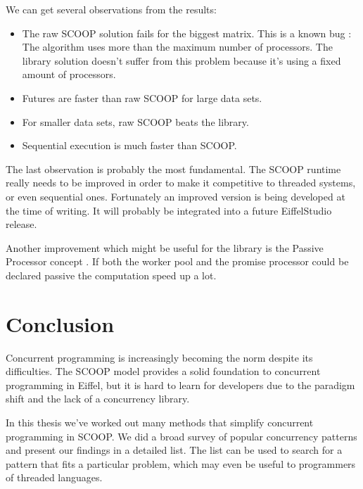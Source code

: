 \documentclass[a4paper,10pt,titlepage]{article}
\begin{document}

We can get several observations from the results:

\begin{itemize}
 \item The raw SCOOP solution fails for the biggest matrix.
 This is a known bug \cite{web:scoop-issues}:
 The algorithm uses more than the maximum number of processors.
 The library solution doesn't suffer from this problem because it's using a fixed amount of processors.
 \item Futures are faster than raw SCOOP for large data sets.
 \item For smaller data sets, raw SCOOP beats the library.
 \item Sequential execution is much faster than SCOOP.
\end{itemize}

The last observation is probably the most fundamental.
The SCOOP runtime really needs to be improved in order to make it competitive to threaded systems, or even sequential ones.
Fortunately an improved version \cite{thesis:scottwest} is being developed at the time of writing.
It will probably be integrated into a future EiffelStudio release.

Another improvement which might be useful for the library is the Passive Processor concept \cite{paper:passive-processors}.
If both the worker pool and the promise processor could be declared passive the computation speed up a lot.

\section{Conclusion}

Concurrent programming is increasingly becoming the norm despite its difficulties.
The SCOOP model provides a solid foundation to concurrent programming in Eiffel, 
but it is hard to learn for developers due to the paradigm shift and the lack of a concurrency library.

In this thesis we've worked out many methods that simplify concurrent programming in SCOOP.
We did a broad survey of popular concurrency patterns and present our findings in a detailed list.
The list can be used to search for a pattern that fits a particular problem, which may even be useful to programmers of threaded languages.
\end{document}
